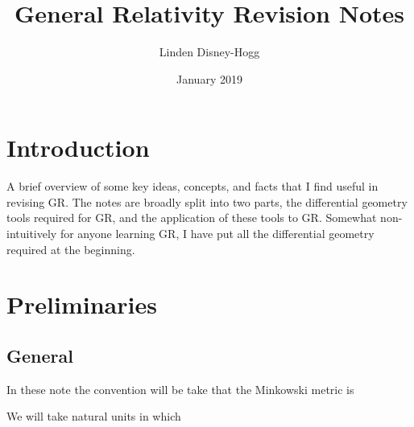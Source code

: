 \documentclass{article}
\title{General Relativity Revision Notes}
\author{Linden Disney-Hogg}
\date{January 2019}
\begin{document}
\maketitle
\tableofcontents

\section{Introduction}
A brief overview of some key ideas, concepts, and facts that I find useful in revising GR. The notes are broadly split into two parts, the differential geometry tools required for GR, and the application of these tools to GR. Somewhat non-intuitively for anyone learning GR, I have put all the differential geometry required at the beginning.
\section{Preliminaries}
\subsection{General}

\begin{definition}
In these note the convention will be take that the Minkowski metric is 
\end{definition}

\begin{definition}
We will take natural units in which 
\end{definition}
\end{document}
